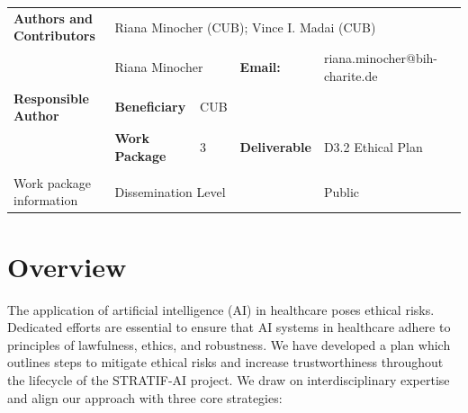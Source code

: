 \documentclass[
  letterpaper,
  DIV=11,
  numbers=noendperiod]{scrreport}
\renewcommand*\contentsname{Table of contents}
\newcommand\contentsname{Table of contents}
\begin{document}
\vspace{0.2cm}

\begin{table}[b]
\begin{tabular}{llllll}
\textbf{Authors and Contributors}             & \multicolumn{4}{l}{Riana Minocher (CUB); Vince I. Madai (CUB)}                                                         \\ 
                                              & \multicolumn{2}{l}{Riana Minocher} & \textbf{Email:}  &  riana.minocher@bih-charite.de  \\ 
\multirow{-2}{*}{\textbf{Responsible Author}} & \textbf{Beneficiary}              & CUB       &                  &  \\ \hline
                                              & \textbf{Work Package}   & 3   & \textbf{Deliverable}              & D3.2 Ethical Plan \\ 
                                              & \cellcolor[HTML]{D0CECE}\textbf{} & \cellcolor[HTML]{D0CECE} & \cellcolor[HTML]{D0CECE}\textbf{} & \cellcolor[HTML]{D0CECE}                                      \\
\multirow{-3}{*}{Work package information}    & \multicolumn{3}{l}{Dissemination Level}                                                          & Public                           
\end{tabular}
\end{table}

\ifdefined\Shaded\renewenvironment{Shaded}{\begin{tcolorbox}[breakable, interior hidden, borderline west={3pt}{0pt}{shadecolor}, enhanced, sharp corners, boxrule=0pt, frame hidden]}{\end{tcolorbox}}\fi

\renewcommand*\contentsname{Table of contents}
{
\hypersetup{linkcolor=}
\setcounter{tocdepth}{2}
\tableofcontents
}

\hypertarget{overview}{%
\chapter*{Overview}\label{overview}}


The application of artificial intelligence (AI) in healthcare poses
ethical risks. Dedicated efforts are essential to ensure that AI systems
in healthcare adhere to principles of lawfulness, ethics, and
robustness. We have developed a plan which outlines steps to mitigate
ethical risks and increase trustworthiness throughout the lifecycle of
the STRATIF-AI project. We draw on interdisciplinary expertise and align
our approach with three core strategies:
\end{document}
